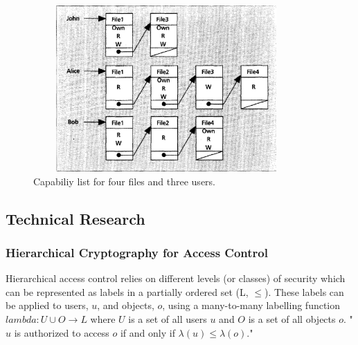 \documentclass[10pt, titlepage]{article}
\begin{document}
\begin{figure}
\centerline{\includegraphics[height=2.5in,width=4in,angle=0]{capabilities.pdf}}
\caption{Capabiliy list for four files and three users.\cite{accessControlPrinciples}}
\label{fig:capabilities}
\end{figure}

\subsection{Technical Research}

\subsubsection{Hierarchical Cryptography for Access Control}
Hierarchical access control relies on different levels (or classes) of security which can be represented as labels in a partially ordered set (L, $≤$). These labels can be applied to users, $u$, and objects, $o$, using a many-to-many labelling function $lambda : U ∪ O → L$ where $U$ is a set of all users $u$ and $O$ is a set of all objects $o$. "$u$ is authorized to access $o$ if and only if $\lambda(u)≤\lambda(o)$\cite{mainPaper}."
\end{document}

